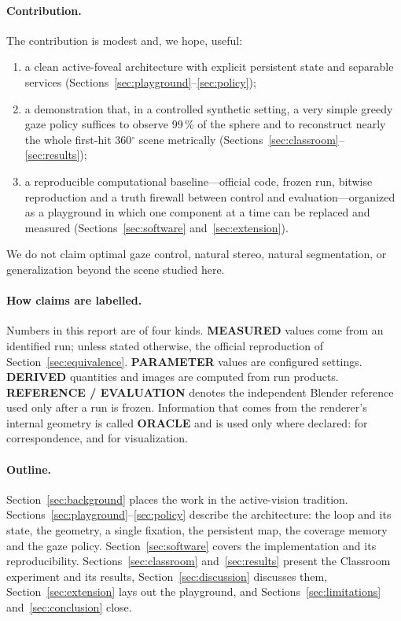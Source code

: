 \documentclass[11pt,a4paper]{article}
\newcommand{\truth}[1]{{\sffamily\footnotesize\textbf{#1}}}
\newcommand{\pct}[1]{#1\,\%}
\newcommand{\degr}{\ensuremath{^\circ}}
\begin{document}
\paragraph{Contribution.} The contribution is modest and, we hope, useful:
\begin{enumerate}
  \item a clean active-foveal architecture with explicit persistent state and separable services
        (Sections~\ref{sec:playground}--\ref{sec:policy});
  \item a demonstration that, in a controlled synthetic setting, a very simple greedy gaze policy suffices to observe
        \pct{99} of the sphere and to reconstruct nearly the whole first-hit 360\degr{} scene metrically
        (Sections~\ref{sec:classroom}--\ref{sec:results});
  \item a reproducible computational baseline---official code, frozen run, bitwise reproduction and a truth firewall
        between control and evaluation---organized as a playground in which one component at a time can be replaced
        and measured (Sections~\ref{sec:software} and~\ref{sec:extension}).
\end{enumerate}
We do not claim optimal gaze control, natural stereo, natural segmentation, or generalization beyond the scene studied
here.

\paragraph{How claims are labelled.} Numbers in this report are of four kinds. \truth{MEASURED} values come from an
identified run; unless stated otherwise, the official reproduction of Section~\ref{sec:equivalence}.
\truth{PARAMETER} values are configured settings. \truth{DERIVED} quantities and images are computed from run products.
\truth{REFERENCE / EVALUATION} denotes the independent Blender reference used only after a run is frozen. Information
that comes from the renderer's internal geometry is called \truth{ORACLE} and is used only where declared: for
correspondence, and for visualization.

\paragraph{Outline.} Section~\ref{sec:background} places the work in the active-vision tradition.
Sections~\ref{sec:playground}--\ref{sec:policy} describe the architecture: the loop and its state, the geometry, a
single fixation, the persistent map, the coverage memory and the gaze policy. Section~\ref{sec:software} covers the
implementation and its reproducibility. Sections~\ref{sec:classroom} and~\ref{sec:results} present the Classroom
experiment and its results, Section~\ref{sec:discussion} discusses them, Section~\ref{sec:extension} lays out the
playground, and Sections~\ref{sec:limitations} and~\ref{sec:conclusion} close.
\end{document}
